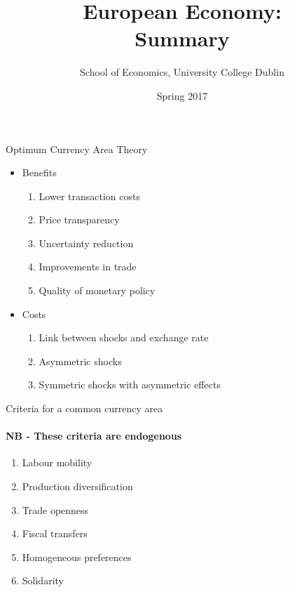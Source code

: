 \documentclass{beamer}
\title{European Economy:\\ Summary}
\author{School of Economics, University College Dublin}
\date{Spring 2017}
\begin{document}
\begin{frame}
\titlepage  
\end{frame}

\begin{frame}{Optimum Currency Area Theory}
  \begin{itemize}
    \item Benefits 
      \begin{enumerate}
        \item Lower transaction costs
        \item Price transparency
        \item Uncertainty reduction
        \item Improvements in trade
        \item Quality of monetary policy
      \end{enumerate}
      \medskip
    \item Costs
    \begin{enumerate}
      \item Link between shocks and exchange rate
      \item Asymmetric shocks
      \item Symmetric shocks with asymmetric effects
    \end{enumerate}
  \end{itemize}
\end{frame}

\begin{frame}{Criteria for a common currency area}\framesubtitle{NB - These criteria are endogenous}
  \begin{enumerate}
    \item Labour mobility
    \item Production diversification
    \item Trade openness
    \medskip
    \item Fiscal transfers
    \item Homogeneous preferences
    \item Solidarity
  \end{enumerate}  
\end{frame}
\end{document}
